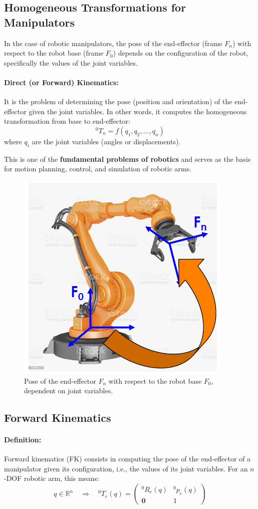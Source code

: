 \hfill

\subsection{Homogeneous Transformations for Manipulators}

In the case of robotic manipulators, the pose of the end-effector (frame $F_n$) with respect to the robot base (frame $F_0$) depends on the configuration of the robot, specifically the values of the joint variables.

\paragraph{Direct (or Forward) Kinematics:}
It is the problem of determining the pose (position and orientation) of the end-effector given the joint variables. In other words, it computes the homogeneous transformation from base to end-effector:
\[
{}^0T_n = f(q_1, q_2, \dots, q_n)
\]
where $q_i$ are the joint variables (angles or displacements).

This is one of the \textbf{fundamental problems of robotics} and serves as the basis for motion planning, control, and simulation of robotic arms.

\begin{figure}[H]
  \centering
  \includegraphics[width=0.4\linewidth]{imgs/forward_kinematics_robot_arm.png}
  \caption{Pose of the end-effector $F_n$ with respect to the robot base $F_0$, dependent on joint variables.}
\end{figure}

\hfill

\subsection{Forward Kinematics}

\paragraph{Definition:}
Forward kinematics (FK) consists in computing the pose of the end-effector of a manipulator given its configuration, i.e., the values of its joint variables. For an $n$-DOF robotic arm, this means:
\[
q \in \mathbb{R}^n \quad \Rightarrow \quad {}^0T_e(q) =
\begin{pmatrix}
{}^0R_e(q) & {}^0p_e(q) \\
\mathbf{0} & 1
\end{pmatrix}
\]

